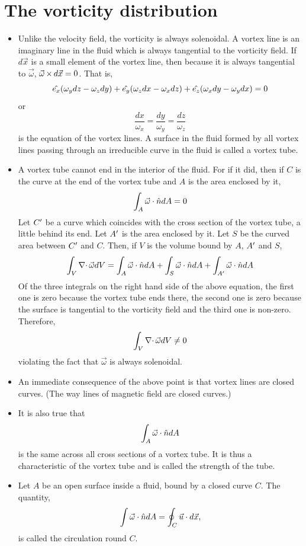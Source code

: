 \section{The vorticity distribution}\label{c2s6}
\begin{itemize}
\item Unlike the velocity field, the vorticity is always solenoidal. A vortex line is an imaginary line in the fluid which is always tangential to the vorticity field. If $d\vec{x}$ is 
a small element of the vortex line, then because it is always tangential to $\vec{\omega}$, $\vec{\omega} \operatorname{\times} d\vec{x} = 0$. That is,
\[
\hat{e_{x}}(\omega_y dz - \omega_z dy) + \hat{e_{y}}(\omega_z dx - \omega_x dz) + \hat{e_{z}}(\omega_x dy - \omega_y dx) = 0
\]
or
\[
\frac{dx}{\omega_x} = \frac{dy}{\omega_y} = \frac{dz}{\omega_z}
\]
is the equation of the vortex lines. A surface in the fluid formed by all vortex lines passing through an irreducible curve in the fluid is called a vortex tube. 

\item A vortex tube cannot end in the interior of the fluid. For if it did, then if $C$ is the curve at the end of the vortex tube and $A$ is the area enclosed by it,
\[
\int_A \vec{\omega}\cdot\hat{n} dA = 0
\]
Let $C^\prime$ be a curve which coincides with the cross section of the vortex tube, a little behind its end. Let $A^\prime$ is the area enclosed by it. Let $S$ be the curved area between
$C^\prime$ and $C$. Then, if $V$ is the volume bound by $A$, $A^\prime$ and $S$,
\[
\int_V \operatorname{\nabla\cdot}{\vec{\omega}} dV = \int_{A} \vec{\omega}\cdot\hat{n} dA + \int_{S} \vec{\omega}\cdot\hat{n} dA + \int_{A^\prime} \vec{\omega}\cdot\hat{n} dA
\]
Of the three integrals on the right hand side of the above equation, the first one is zero because the vortex tube ends there, the second one is zero because the surface is tangential
to the vorticity field and the third one is non-zero. Therefore,
\[
\int_V \operatorname{\nabla\cdot}{\vec{\omega}} dV \ne 0
\]
violating the fact that $\vec{\omega}$ is always solenoidal.

\item An immediate consequence of the above point is that vortex lines are closed curves. (The way lines of magnetic field are closed curves.)

\item It is also true that 
\[
\int_A \vec{\omega}\cdot\hat{n} dA 
\]
is the same across all cross sections of a vortex tube. It is thus a characteristic of the vortex tube and is called the strength of the tube.

\item Let $A$ be an open surface inside a fluid, bound by a closed curve $C$. The quantity,
\[
\int\vec{\omega}\cdot\hat{n} dA = \oint_C \vec{u}\cdot d\vec{x},
\]
is called the circulation round $C$.


\end{itemize}
